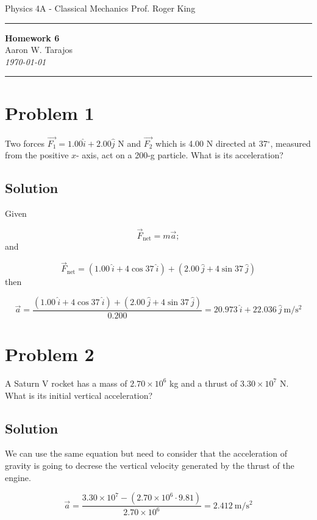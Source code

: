 \documentclass{article}
\begin{document}
\noindent
Physics 4A - Classical Mechanics \hfill Prof. Roger King

\noindent\rule{\textwidth}{0.4pt}

\begin{center}
    \textbf{\LARGE Homework 6} \\
    \vspace{12pt}
    \large Aaron W. Tarajos \\
    \textit{\today}
\end{center}

\noindent\rule{\textwidth}{0.4pt}

\section*{Problem 1}
Two forces $\vec{F_1} = 1.00 \hat i + 2.00 \hat j$ N and $\vec{F_2}$ which is 4.00 N directed at 37$^\circ$, measured from the positive $x$-
axis, act on a 200-g particle. What is its acceleration?

\subsection*{Solution}
Given

\[
	\vec{F}_\text{net} = m \vec{a};
\]
and

\[
	\vec{F}_\text{net} = \left( 1.00\ \hat i + 4\cos 37\ \hat i \right) + \left( 2.00\ \hat j + 4\sin 37\ \hat j \right)
\]
then

\[
	\vec{a} = \frac{\left( 1.00\ \hat i + 4\cos 37\ \hat i \right) + \left( 2.00\ \hat j + 4\sin 37\ \hat j \right)}{0.200} = \boxed{20.973\ \hat i + 22.036\ \hat j\ \text{m}/\text{s}^2}
\]

\section*{Problem 2}
A Saturn V rocket has a mass of $2.70 \times 10^6$ kg and a thrust of $3.30 \times 10^7$ N. What is its initial vertical
acceleration?

\subsection*{Solution}
We can use the same equation but need to consider that the acceleration of gravity is going to decrese the vertical velocity generated by the thrust of the engine.

\[
	\vec{a} = \frac{3.30 \times 10^7 - \left( 2.70 \times 10^6 \cdot 9.81\right)}{2.70 \times 10^6} = \boxed{2.412\ \text{m}/\text{s}^2}
\]
\end{document}
